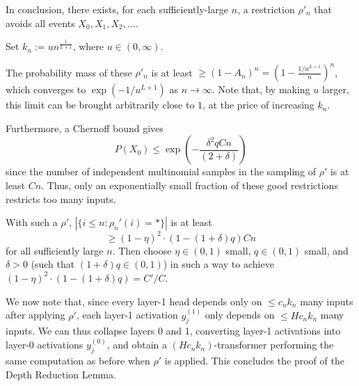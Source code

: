 \documentclass[11pt,a4paper]{article}
\begin{document}
In conclusion, there exists, for each sufficiently-large $n$, a restriction $\rho'_n$ that avoids all events $X_0, X_1, X_2, \dots$.

Set $k_n := u n^\frac{1}{L+1}$, where $u \in (0,\infty)$.

The probability mass of these $\rho'_n$ is at least
$\geq (1-A_n)^n = (1-\frac{1/u^{L+1}}{n})^n$, which converges to $\exp(-1/u^{L+1})$ as $n \rightarrow \infty$.
Note that, by making $u$ larger, this limit can be brought arbitrarily close to $1$, at the price of increasing $k_n$.


Furthermore, a Chernoff bound gives~\cite{mitzenmacherprobability}
\begin{equation}
P(X_0) \leq    \exp\left(-\frac{\delta^2qCn}{(2+\delta)}\right)
\end{equation}
since the number of independent multinomial samples in the sampling of $\rho'$ is at least $Cn$.
Thus, only an exponentially small fraction of these good restrictions restricts too many inputs.


With such a $\rho'$, $|\{i \leq n: \rho_n'(i) = *\}|$ is at least
\begin{equation}
\geq (1-\eta)^2\cdot (1-(1+\delta)q) C n
\end{equation}
for all sufficiently large $n$.
Then choose $\eta \in (0,1)$ small, $q \in (0,1)$ small, and $\delta >0$ (such that $(1+\delta)q \in (0,1)$) in such a way to achieve $(1-\eta)^2\cdot (1-(1+\delta)q) = C'/C$.




We now note that, since every layer-1 head depends only on $\leq c_n k_n$ many inputs after applying $\rho'$, each layer-1 activation $y_j^{(1)}$ only depends on $\leq Hc_nk_n$ many inputs.
We can thus collapse layers 0 and 1, converting layer-1 activations into layer-0 activations $y_j^{(0)}$, and obtain a $(Hc_nk_n)$-transformer performing the same computation as before when $\rho'$ is applied.
This concludes the proof of the Depth Reduction Lemma.


\end{document}
